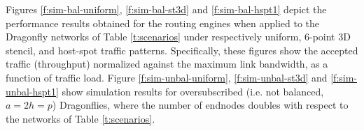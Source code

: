 \documentclass[review]{elsarticle}
\newcommand{\dflys}{Dragonflies}
\newcommand{\dfly}{Dragonfly}
\begin{document}
\begin{table}[!hptb]
\caption{\small Number of SLs and VLs required in fully-connected balanced \dfly{} networks of different sizes.}
\centering
{}
\label{t:scenarios}
\end{table}

Figures \ref{f:sim-bal-uniform}, \ref{f:sim-bal-st3d} and \ref{f:sim-bal-hspt1} depict the performance results obtained
for the routing engines when applied to the \dfly{} networks of Table \ref{t:scenarios} under respectively uniform, 6-point 3D stencil, and host-spot traffic patterns.
Specifically, these figures show the accepted traffic (throughput) normalized against the maximum link bandwidth, as a function of traffic load.
Figure \ref{f:sim-unbal-uniform}, \ref{f:sim-unbal-st3d} and \ref{f:sim-unbal-hspt1} show simulation results for oversubscribed
(i.e. not balanced, $a = 2h = p$) \dflys{}, where the number of endnodes doubles with respect to the networks of Table \ref{t:scenarios}.
\end{document}

